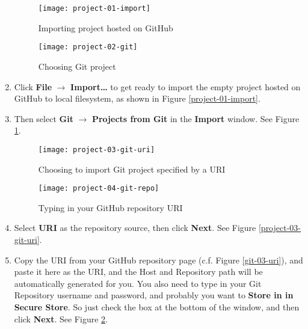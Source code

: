 \begin{enumerate}

\begin{figure}[t]
\hspace{-2em}
\begin{minipage}{0.5\textwidth}
\centering
\texttt{[image: project-01-import]}
\caption{Importing project hosted on GitHub\label{project-01-import}}
\end{minipage}
\hfill
\begin{minipage}{0.5\textwidth}
\centering
\texttt{[image: project-02-git]}
\caption{Choosing Git project\label{project-02-git}}
\end{minipage}
\hspace{-2em}
\end{figure}

\item Click \textbf{File} $\rightarrow$ \textbf{Import\ldots} to get ready to import the empty project hosted on GitHub to local filesystem, as shown in Figure \ref{project-01-import}.
\item Then select \textbf{Git} $\rightarrow$ \textbf{Projects from Git} in the \textbf{Import} window. See Figure \ref{project-02-git}.

\begin{figure}[t]
\hspace{-2em}
\begin{minipage}{0.5\textwidth}
\centering
\texttt{[image: project-03-git-uri]}
\caption{Choosing to import Git project specified by a URI\label{project-03-git-uri}}
\end{minipage}
\hfill
\begin{minipage}{0.5\textwidth}
\centering
\texttt{[image: project-04-git-repo]}
\caption{Typing in your GitHub repository URI\label{project-04-git-repo}}
\end{minipage}
\hspace{-2em}
\end{figure}

\item Select \textbf{URI} as the repository source, then click \textbf{Next}. See Figure \ref{project-03-git-uri}.
\item Copy the URI from your GitHub repository page (c.f. Figure \ref{git-03-uri}), and paste it here as the URI, and the Host and Repository path will be automatically generated for you. You also need to type in your Git Repository username and password, and probably you want to \textbf{Store in in Secure Store}. So just check the box at the bottom of the window, and then click \textbf{Next}. See Figure \ref{project-04-git-repo}.


\end{enumerate}

